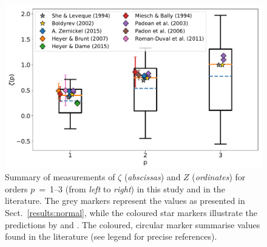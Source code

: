 \begin{figure}
	\includegraphics[width=\textwidth]{compare_observations.pdf}
	\caption{Summary of measurements of $\zeta$ (\textit{abscissas}) and $Z$ (\textit{ordinates}) for orders $p$~=~1--3 (from \textit{left} to \textit{right}) in this study and in the literature.
		The grey markers represent the values as presented in Sect.~\ref{results:normal}, while the coloured star markers illustrate the predictions by \citet{She1994} and \citet{Boldyrev2002}. The coloured, circular marker summarise values found in the literature (see legend for precise references). 
	}
	\label{pic:discussion:comp_observation}
\end{figure}











